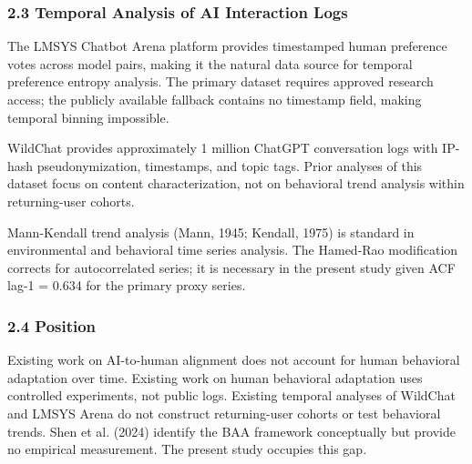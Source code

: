 \subsubsection{2.3 Temporal Analysis of AI Interaction Logs}

The LMSYS Chatbot Arena platform \citep{Zheng2023Judging} provides timestamped human preference votes across model pairs, making it the natural data source for temporal preference entropy analysis. The primary dataset requires approved research access; the publicly available fallback contains no timestamp field, making temporal binning impossible.

WildChat \citep{Zhao2024WildChat} provides approximately 1 million ChatGPT conversation logs with IP-hash pseudonymization, timestamps, and topic tags. Prior analyses of this dataset focus on content characterization, not on behavioral trend analysis within returning-user cohorts.

Mann-Kendall trend analysis (Mann, 1945; Kendall, 1975) is standard in environmental and behavioral time series analysis. The Hamed-Rao modification \citep{Hamed1998Modified} corrects for autocorrelated series; it is necessary in the present study given ACF lag-1 = 0.634 for the primary proxy series.

\subsubsection{2.4 Position}

Existing work on AI-to-human alignment does not account for human behavioral adaptation over time. Existing work on human behavioral adaptation uses controlled experiments, not public logs. Existing temporal analyses of WildChat and LMSYS Arena do not construct returning-user cohorts or test behavioral trends. Shen et al. (2024) identify the BAA framework conceptually but provide no empirical measurement. The present study occupies this gap.

